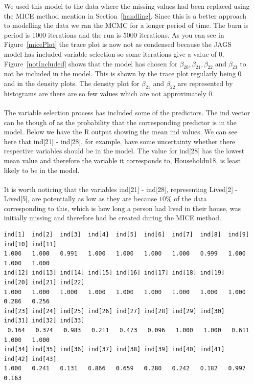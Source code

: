 \documentclass{article}
\begin{document}
\noindent We used this model to the data where the missing values had been replaced using the MICE method mention in Section~\ref{handling}. Since this is a better approach to modelling the data we ran the MCMC for a longer period of time. The burn is period is 1000 iterations and the run is 5000 iterations. As you can see in Figure~\ref{micePlot} the trace plot is now not as condensed because the JAGS model has included variable selection so some iterations give a value of 0. Figure~\ref{notIncluded} shows that the model has chosen for $\beta_{20}, \beta_{21}, \beta_{22}$ and $\beta_{23}$ to not be included in the model. This is shown by the trace plot regularly being 0 and in the density plots. The density plot for $\beta_21$ and $\beta_22$ are represented by histograms are there are so few values which are not approximately 0.
\\\\
The variable selection process has included some of the predictors. The \textsf{ind} vector can be though of as the probability that the corresponding predictor is in the model. Below we have the \textsf{R} output showing the mean \textsf{ind} values. We can see here that \textsf{ind[21] - ind[28]}, for example, have some uncertainty whether there respective variables should be in the model. The value for \textsf{ind[28]} has the lowest mean value and therefore the variable it corresponds to, \textsf{Householdu18}, is least likely to be in the model. 
\\\\
It is worth noticing that the variables \textsf{ind[21] - ind[28]}, representing Lived[2] - Lived[5], are potentially as low as they are because $10\%$ of the data corresponding to this, which is how long a person had lived in their house, was initially missing and therefore had be created during the MICE method.
{\small
\begin{verbatim}
ind[1]  ind[2]  ind[3]  ind[4]  ind[5]  ind[6]  ind[7]  ind[8]  ind[9] ind[10] ind[11]
1.000   1.000   0.991   1.000   1.000   1.000   1.000   0.999   1.000   1.000   1.000 
ind[12] ind[13] ind[14] ind[15] ind[16] ind[17] ind[18] ind[19] ind[20] ind[21] ind[22]   
1.000   1.000   1.000   1.000   1.000   1.000   1.000   1.000   1.000   0.286   0.256  
ind[23] ind[24] ind[25] ind[26] ind[27] ind[28] ind[29] ind[30] ind[31] ind[32] ind[33]
 0.164   0.374   0.983   0.211   0.473   0.096   1.000   1.000   0.611   1.000   1.000 
ind[34] ind[35] ind[36] ind[37] ind[38] ind[39] ind[40] ind[41] ind[42] ind[43] 
1.000   0.241   0.131   0.866   0.659   0.280   0.242   0.182   0.997   0.163 
\end{verbatim}
}
\end{document}
